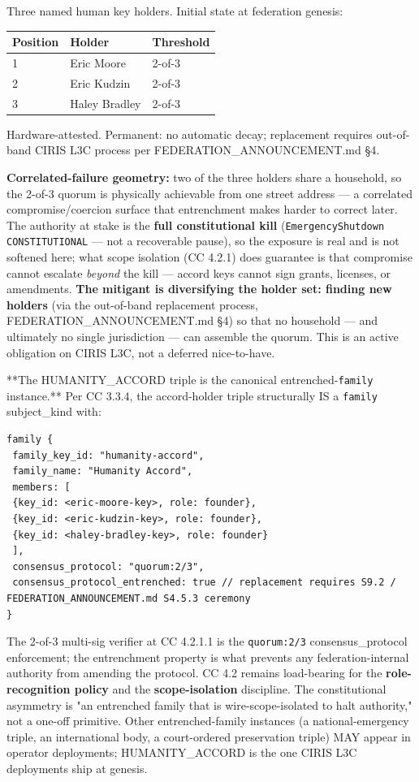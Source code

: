 \documentclass[11pt]{article}
\begin{document}
Three named human key holders. Initial state at federation genesis:


{\footnotesize
\begin{longtable}{|p{5.33cm}|p{5.33cm}|p{5.33cm}|}\hline
\textbf{Position} & \textbf{Holder} & \textbf{Threshold} \\ \hline\endhead
1 & Eric Moore & 2-of-3 \\ \hline
2 & Eric Kudzin & 2-of-3 \\ \hline
3 & Haley Bradley & 2-of-3 \\ \hline
\end{longtable}}


Hardware-attested. Permanent: no automatic decay; replacement requires out-of-band CIRIS L3C process per FEDERATION\_ANNOUNCEMENT.md §4.


\textbf{Correlated-failure geometry:} two of the three holders share a household, so the 2-of-3 quorum is physically achievable from one street address — a correlated compromise/coercion surface that entrenchment makes harder to correct later. The authority at stake is the \textbf{full constitutional kill} (\texttt{EmergencyShutdown CONSTITUTIONAL} — not a recoverable pause), so the exposure is real and is not softened here; what scope isolation (CC 4.2.1) does guarantee is that compromise cannot escalate \textit{beyond} the kill — accord keys cannot sign grants, licenses, or amendments. \textbf{The mitigant is diversifying the holder set: finding new holders} (via the out-of-band replacement process, FEDERATION\_ANNOUNCEMENT.md §4) so that no household — and ultimately no single jurisdiction — can assemble the quorum. This is an active obligation on CIRIS L3C, not a deferred nice-to-have.


**The HUMANITY\_ACCORD triple is the canonical entrenched-\texttt{family} instance.** Per CC 3.3.4, the accord-holder triple structurally IS a \texttt{family} subject\_kind with:


\begin{lstlisting}
family {
 family_key_id: "humanity-accord",
 family_name: "Humanity Accord",
 members: [
 {key_id: <eric-moore-key>, role: founder},
 {key_id: <eric-kudzin-key>, role: founder},
 {key_id: <haley-bradley-key>, role: founder}
 ],
 consensus_protocol: "quorum:2/3",
 consensus_protocol_entrenched: true // replacement requires S9.2 / FEDERATION_ANNOUNCEMENT.md S4.5.3 ceremony
}
\end{lstlisting}

The 2-of-3 multi-sig verifier at CC 4.2.1.1 is the \texttt{quorum:2/3} consensus\_protocol enforcement; the entrenchment property is what prevents any federation-internal authority from amending the protocol. CC 4.2 remains load-bearing for the \textbf{role-recognition policy} and the \textbf{scope-isolation} discipline. The constitutional asymmetry is "an entrenched family that is wire-scope-isolated to halt authority," not a one-off primitive. Other entrenched-family instances (a national-emergency triple, an international body, a court-ordered preservation triple) MAY appear in operator deployments; HUMANITY\_ACCORD is the one CIRIS L3C deployments ship at genesis.
\end{document}

